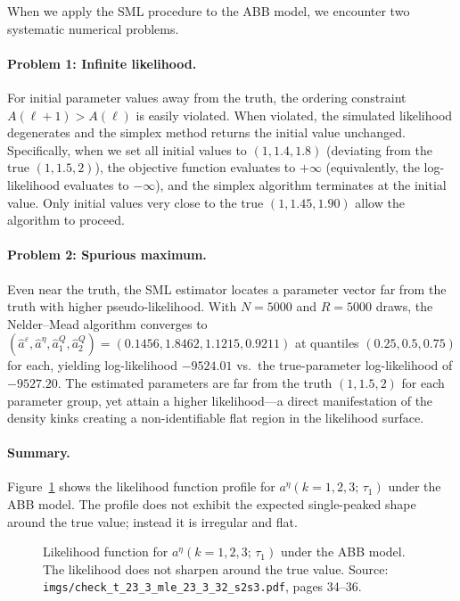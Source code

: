\documentclass[12pt]{article}
\begin{document}
When we apply the SML procedure to the ABB model, we encounter two systematic
numerical problems.

\paragraph{Problem 1: Infinite likelihood.}
For initial parameter values away from the truth, the ordering constraint
$A(\ell+1)>A(\ell)$ is easily violated.
When violated, the simulated likelihood degenerates and the simplex method
returns the initial value unchanged.
Specifically, when we set all initial values to $(1, 1.4, 1.8)$ (deviating
from the true $(1, 1.5, 2)$), the objective function evaluates to $+\infty$
(equivalently, the log-likelihood evaluates to $-\infty$), and the simplex
algorithm terminates at the initial value.
Only initial values very close to the true $(1, 1.45, 1.90)$ allow the
algorithm to proceed.

\paragraph{Problem 2: Spurious maximum.}
Even near the truth, the SML estimator locates a parameter vector far from the
truth with higher pseudo-likelihood.
With $N=5000$ and $R=5000$ draws, the Nelder--Mead algorithm converges to
$(\hat a^\varepsilon, \hat a^\eta, \hat a_1^Q, \hat a_2^Q) = (0.1456, 1.8462, 1.1215, 0.9211)$
at quantiles $(0.25, 0.5, 0.75)$ for each, yielding log-likelihood
$-9524.01$ vs.\ the true-parameter log-likelihood of $-9527.20$.
The estimated parameters are far from the truth $(1, 1.5, 2)$ for each
parameter group, yet attain a higher likelihood---a direct manifestation
of the density kinks creating a non-identifiable flat region in the
likelihood surface.

\paragraph{Summary.}
Figure~\ref{fig:mle_lik} shows the likelihood function profile for
$a^\eta(k=1,2,3;\,\tau_1)$ under the ABB model.
The profile does not exhibit the expected single-peaked shape around the true
value; instead it is irregular and flat.

\begin{figure}[H]
\centering
\caption{Likelihood function for $a^\eta(k=1,2,3;\,\tau_1)$ under the ABB model.
The likelihood does not sharpen around the true value.
Source: \texttt{imgs/check\_t\_23\_3\_mle\_23\_3\_32\_s2s3.pdf}, pages 34--36.}
\label{fig:mle_lik}
\end{figure}
\end{document}

